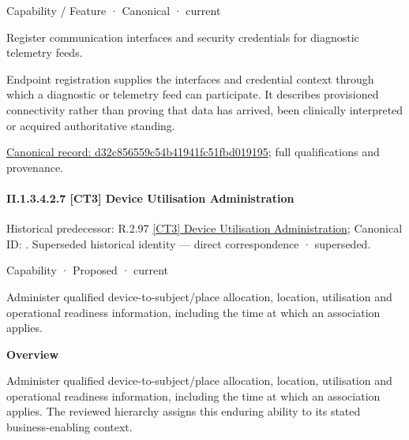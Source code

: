 \label{element:d32c856559c54b41941fc51fbd019195}
{\small Capability / Feature · Canonical · current}\par

Register communication interfaces and security credentials for diagnostic telemetry feeds.



Endpoint registration supplies the interfaces and credential context through which a diagnostic or telemetry feed can participate. It describes provisioned connectivity rather than proving that data has arrived, been clinically interpreted or acquired authoritative standing.


{\footnotesize \href{../../../../../../../continuum/strategy/capability/feature/d32c856559c54b41941fc51fbd019195.md}{Canonical record: d32c856559c54b41941fc51fbd019195}; full qualifications and provenance.}\par
\paragraph*{II.1.3.4.2.7 [CT3] Device Utilisation Administration}
\label{navigation:II.1.3.4.2.7}

{\small Historical predecessor: R.2.97 \hyperref[element:a0af0a86667d48f4ab95ed2920e878cb]{[CT3] Device Utilisation Administration}; Canonical ID: \texttt{}. Superseded historical identity — direct correspondence · superseded.}\par
\label{element:1a3732b5911c45b3aece38b2db2d0f15}
{\small Capability · Proposed · current}\par

Administer qualified device-to-subject/place allocation, location, utilisation and operational readiness information, including the time at which an association applies.



\textbf{Overview}



Administer qualified device-to-subject/place allocation, location, utilisation and operational readiness information, including the time at which an association applies. The reviewed hierarchy assigns this enduring ability to its stated business-enabling context.




